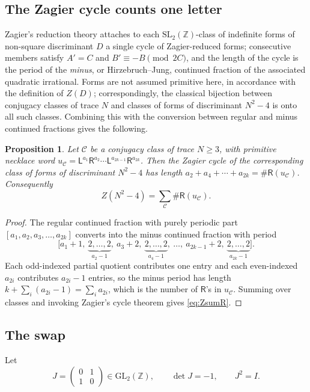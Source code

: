 \documentclass[11pt,reqno]{amsart}
\theoremstyle{plain}
\newtheorem{proposition}[theorem]{Proposition}
\theoremstyle{definition}
\newcommand{\Z}{\mathbb{Z}}
\newcommand{\Ll}{\mathsf{L}}
\newcommand{\Rr}{\mathsf{R}}
\newcommand{\SL}{\mathrm{SL}}
\newcommand{\GL}{\mathrm{GL}}
\begin{document}
\subsection{The Zagier cycle counts one letter}
Zagier's reduction theory \cite[\S13]{Zagier} attaches to each $\SL_2(\Z)$-class of
indefinite forms of non-square discriminant $D$ a single cycle of Zagier-reduced forms;
consecutive members satisfy $A'=C$ and $B'\equiv-B\pmod{2C}$, and the length of the
cycle is the period of the \emph{minus}, or Hirzebruch--Jung, continued fraction of the
associated quadratic irrational. Forms are not assumed primitive here, in accordance
with the definition of $Z(D)$; correspondingly, the classical bijection between
conjugacy classes of trace $N$ and classes of forms of discriminant $N^2-4$ is onto all
such classes. Combining this with the conversion between regular and minus continued
fractions gives the following.

\begin{proposition}\label{prop:zagierR}
Let $\mathcal{C}$ be a conjugacy class of trace $N\ge3$, with primitive necklace word
$u_\mathcal{C}=\Ll^{a_1}\Rr^{a_2}\cdots\Ll^{a_{2k-1}}\Rr^{a_{2k}}$. Then the Zagier cycle
of the corresponding class of forms of discriminant $N^2-4$ has length
$a_2+a_4+\cdots+a_{2k}=\#\Rr(u_\mathcal{C})$. Consequently
\begin{equation}\label{eq:ZsumR}
  Z(N^2-4)=\sum_{\mathcal{C}}\#\Rr(u_\mathcal{C}).
\end{equation}
\end{proposition}

\begin{proof}
The regular continued fraction with purely periodic part $[a_1,a_2,a_3,\dots,a_{2k}]$
converts into the minus continued fraction with period
\[
  \bigl[a_1+1,\ \underbrace{2,\dots,2}_{a_2-1},\ a_3+2,\
  \underbrace{2,\dots,2}_{a_4-1},\ \dots,\ a_{2k-1}+2,\
  \underbrace{2,\dots,2}_{a_{2k}-1}\bigr].
\]
Each odd-indexed partial quotient contributes one entry and each even-indexed $a_{2i}$
contributes $a_{2i}-1$ entries, so the minus period has length
$k+\sum_{i}(a_{2i}-1)=\sum_i a_{2i}$, which is the number of $\Rr$'s in
$u_\mathcal{C}$. Summing over classes and invoking Zagier's cycle theorem gives
\eqref{eq:ZsumR}.
\end{proof}

\subsection{The swap}
Let
\[
  J=\begin{pmatrix}0&1\\1&0\end{pmatrix}\in\GL_2(\Z),\qquad \det J=-1,\qquad J^2=I .
\]
\end{document}
